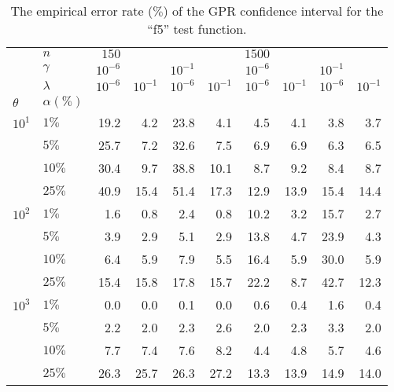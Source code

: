 \documentclass[a4paper,14pt]{extarticle}
\begin{document}
\begin{table}
  \centering
  \caption{The empirical error rate ($\%$) of the GPR confidence interval for the
  ``f5'' test function.}
  \label{tab:nongaussian_f5_2d_cov_gpr}
  \begin{tabular}{ll||rrrr|rrrr}
  \toprule
       & $n$ & $150$ &          &        &          & $1500$ &          &        &          \\\cline{2-2}
       & $\gamma$ & $10^{-6}$ &          & $10^{-1}$ &          & $10^{-6}$ &          & $10^{-1}$ &          \\\cline{2-2}
       & $\lambda$ & $10^{-6}$ & $10^{-1}$ & $10^{-6}$ & $10^{-1}$ & $10^{-6}$ & $10^{-1}$ & $10^{-6}$ & $10^{-1}$ \\\cline{2-2}
  $\theta$ & $\alpha(\%)$ &          &          &          &          &          &          &          &          \\
  \midrule
  $10^1$ & $1\%$ &     19.2 &      4.2 &     23.8 &      4.1 &      4.5 &      4.1 &      3.8 &      3.7 \\
       & $5\%$ &     25.7 &      7.2 &     32.6 &      7.5 &      6.9 &      6.9 &      6.3 &      6.5 \\
       & $10\%$ &     30.4 &      9.7 &     38.8 &     10.1 &      8.7 &      9.2 &      8.4 &      8.7 \\
       & $25\%$ &     40.9 &     15.4 &     51.4 &     17.3 &     12.9 &     13.9 &     15.4 &     14.4 \\
  \midrule
  $10^2$ & $1\%$ &      1.6 &      0.8 &      2.4 &      0.8 &     10.2 &      3.2 &     15.7 &      2.7 \\
       & $5\%$ &      3.9 &      2.9 &      5.1 &      2.9 &     13.8 &      4.7 &     23.9 &      4.3 \\
       & $10\%$ &      6.4 &      5.9 &      7.9 &      5.5 &     16.4 &      5.9 &     30.0 &      5.9 \\
       & $25\%$ &     15.4 &     15.8 &     17.8 &     15.7 &     22.2 &      8.7 &     42.7 &     12.3 \\
  \midrule
  $10^3$ & $1\%$ &      0.0 &      0.0 &      0.1 &      0.0 &      0.6 &      0.4 &      1.6 &      0.4 \\
       & $5\%$ &      2.2 &      2.0 &      2.3 &      2.6 &      2.0 &      2.3 &      3.3 &      2.0 \\
       & $10\%$ &      7.7 &      7.4 &      7.6 &      8.2 &      4.4 &      4.8 &      5.7 &      4.6 \\
       & $25\%$ &     26.3 &     25.7 &     26.3 &     27.2 &     13.3 &     13.9 &     14.9 &     14.0 \\

\end{tabular}
\end{table}
\end{document}
